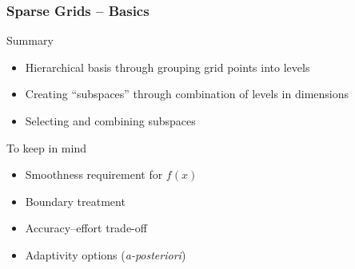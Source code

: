 \begin{frame}
  \frametitle{Sparse Grids -- Basics}
  \topline
  \vspace{-10px}
  \begin{block}{Summary}
    \begin{itemize}
      \item Hierarchical basis through grouping grid points into levels
      \item Creating ``subspaces'' through combination of levels in dimensions
      \item Selecting and combining subspaces
      \end{itemize}
  \end{block}
  \begin{block}{To keep in mind}
    \begin{itemize}
      \item Smoothness requirement for $f(x)$
      \item Boundary treatment
      \item Accuracy--effort trade-off
      \item Adaptivity options (\emph{a-posteriori})
      \end{itemize}
  \end{block}
\end{frame}

